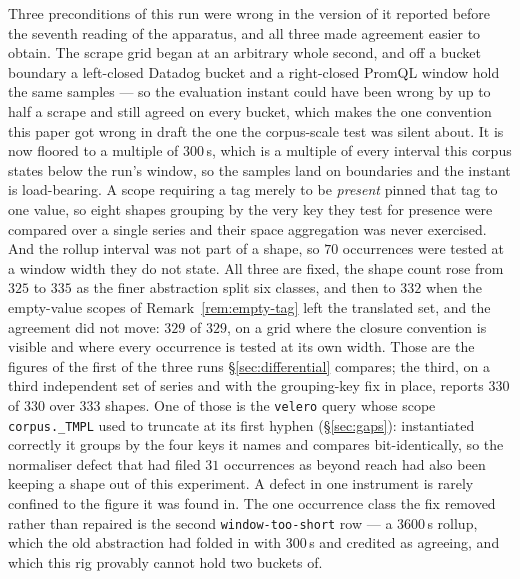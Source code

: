 \begin{remark}\label{rem:differential-fixes}
Three preconditions of this run were wrong in the version of it reported before the
seventh reading of the apparatus, and all three made agreement easier to obtain. The
scrape grid began at an arbitrary whole second, and off a bucket boundary a left-closed
Datadog bucket and a right-closed PromQL window hold the same samples --- so the
evaluation instant could have been wrong by up to half a scrape and still agreed on every
bucket, which makes the one convention this paper got wrong in draft the one the
corpus-scale test was silent about. It is now floored to a multiple of $300$\,s, which is
a multiple of every interval this corpus states below the run's window, so the samples
land on boundaries and the instant is load-bearing. A scope requiring a tag merely to be
\emph{present} pinned that tag to one value, so eight shapes grouping by the very key
they test for presence were compared over a single series and their space aggregation was
never exercised. And the rollup interval was not part of a shape, so $70$ occurrences were
tested at a window width they do not state. All three are fixed, the shape count rose
from $325$ to $335$ as the finer abstraction split six classes, and then to $332$ when
the empty-value scopes of Remark~\ref{rem:empty-tag} left the translated set, and the
agreement did not
move: $329$ of $329$, on a grid where the closure convention is visible and where every
occurrence is tested at its own width. Those are the figures of the first of the three runs
\S\ref{sec:differential} compares; the third, on a third independent set of series and
with the grouping-key fix in place, reports $330$ of $330$ over $333$ shapes. One of those is the \texttt{velero} query whose scope
\texttt{corpus.\_TMPL} used to truncate at its first hyphen (\S\ref{sec:gaps}):
instantiated correctly it groups by the four keys it names and compares bit-identically,
so the normaliser defect that had filed $31$ occurrences as beyond reach had also been
keeping a shape out of this experiment. A defect in one instrument is rarely confined
to the figure it was found in. The one occurrence class the fix removed rather
than repaired is the second \texttt{window-too-short} row --- a $3600$\,s rollup, which
the old abstraction had folded in with $300$\,s and credited as agreeing, and which this
rig provably cannot hold two buckets of.
\end{remark}
